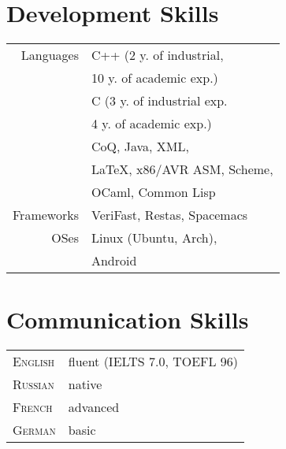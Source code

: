 \documentclass[10pt]{article} %
\begin{document}
\begin{minipage}[h]{0.44\textwidth}

\section{Development Skills} 

\begin{tabular}{rl}
Languages
&C++ (2 y. of industrial,\\
&     10 y. of academic exp.)\\
&C (3 y. of industrial exp.\\
&   4 y. of academic exp.)\\
&CoQ, Java, XML,\\
&\LaTeX, x86/AVR ASM, Scheme,\\
&OCaml, Common Lisp\\
Frameworks
&VeriFast, Restas, Spacemacs\\
OSes
&Linux (Ubuntu, Arch),\\
&Android\\
\end{tabular}


\section{Communication Skills} 

\begin{tabular}{ll}
\textsc{English}
& fluent (IELTS 7.0, TOEFL 96) \\
\textsc{Russian}
& native \\
\textsc{French}
& advanced \\
\textsc{German}
& basic \\
\end{tabular}\\[10pt]

	

\end{minipage} %
\end{document}
